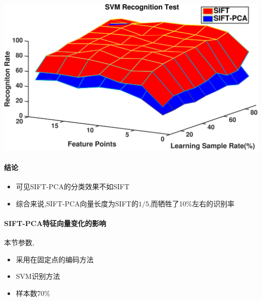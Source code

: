 		\begin{center}
		\begin{minipage}[t]{\linewidth}
		\center
		{
		\includegraphics[width=\textwidth]{Img/c3/sift_sift_pca_svm} 
		}
		\end{minipage}
		\medskip
		\end{center}
	
\paragraph{结论}
\begin{itemize}
	\item 可见SIFT-PCA的分类效果不如SIFT
	\item 综合来说,SIFT-PCA向量长度为SIFT的$1/5$,而牺牲了10\%左右的识别率
\end{itemize}

\paragraph{SIFT-PCA特征向量变化的影响}
本节参数,
\begin{itemize}
	\item 采用在固定点的编码方法
	\item SVM识别方法
	\item 样本数70\%
\end{itemize}

